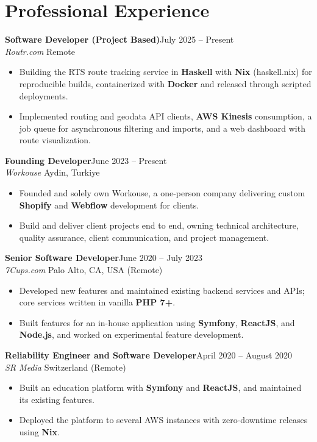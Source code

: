 \documentclass[11pt,a4paper]{article}
\newcommand{\role}[4]{%
  \par\addvspace{5pt}\noindent
  \textbf{#1}\hfill{\small #4}\\
  {\itshape #2}\hfill{\small\color{mutedtext} #3}\par\nopagebreak
}
\begin{document}
\section{Professional Experience}
\role{Software Developer (Project Based)}{Routr.com}{Remote}{July 2025 -- Present}
\begin{itemize}
  \item Building the RTS route tracking service in \textbf{Haskell} with \textbf{Nix} (haskell.nix) for reproducible
    builds, containerized with \textbf{Docker} and released through scripted deployments.
  \item Implemented routing and geodata API clients, \textbf{AWS Kinesis} consumption, a job queue for asynchronous
    filtering and imports, and a web dashboard with route visualization.
\end{itemize}

\role{Founding Developer}{Workouse}{Aydin, Turkiye}{June 2023 -- Present}
\begin{itemize}
  \item Founded and solely own Workouse, a one-person company delivering custom \textbf{Shopify} and \textbf{Webflow}
    development for clients.
  \item Build and deliver client projects end to end, owning technical architecture, quality assurance,
    client communication, and project management.
\end{itemize}

\role{Senior Software Developer}{7Cups.com}{Palo Alto, CA, USA (Remote)}{June 2020 -- July 2023}
\begin{itemize}
  \item Developed new features and maintained existing backend services and APIs; core services written in
    vanilla \textbf{PHP 7+}.
  \item Built features for an in-house application using \textbf{Symfony}, \textbf{ReactJS}, and \textbf{Node.js},
    and worked on experimental feature development.
\end{itemize}

\role{Reliability Engineer and Software Developer}{SR Media}{Switzerland (Remote)}{April 2020 -- August 2020}
\begin{itemize}
  \item Built an education platform with \textbf{Symfony} and \textbf{ReactJS}, and maintained its existing features.
  \item Deployed the platform to several AWS instances with zero-downtime releases using \textbf{Nix}.
\end{itemize}
\end{document}
